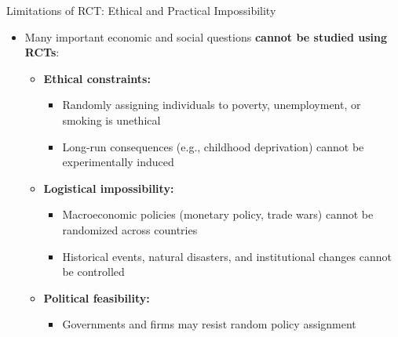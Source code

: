 \documentclass[hyperref={pdfpagelabels=false}]{beamer}
\begin{document}
	\begin{frame}{Limitations of RCT: Ethical and Practical Impossibility}
		\begin{itemize}
			\item Many important economic and social questions \textbf{cannot be studied using RCTs}:
			\vspace{0.3cm}
			\begin{itemize}
				\item \textbf{Ethical constraints:}
				\vspace{0.1cm}
				\begin{itemize}
					\item Randomly assigning individuals to poverty, unemployment, or smoking is unethical
					\vspace{0.1cm}
					\item Long-run consequences (e.g., childhood deprivation) cannot be experimentally induced
				\end{itemize}
				\vspace{0.3cm}
				\item \textbf{Logistical impossibility:}
				\vspace{0.1cm}
				\begin{itemize}
					\item Macroeconomic policies (monetary policy, trade wars) cannot be randomized across countries
					\vspace{0.1cm}
					\item Historical events, natural disasters, and institutional changes cannot be controlled
				\end{itemize}
				\vspace{0.3cm}
				\item \textbf{Political feasibility:}
				\vspace{0.1cm}
				\begin{itemize}
					\item Governments and firms may resist random policy assignment
				\end{itemize}
			\end{itemize}
		\end{itemize}
	\end{frame}
	
\end{document}
